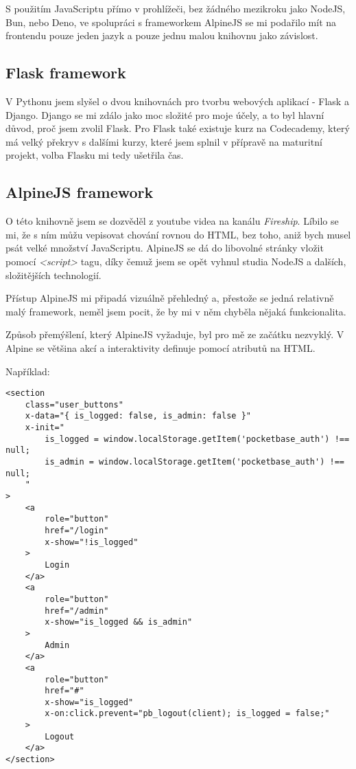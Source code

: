\documentclass[11pt,a4paper,twoside,openright]{report}
\begin{document}
S použitím JavaScriptu přímo v prohlížeči, bez žádného mezikroku jako NodeJS, Bun, nebo Deno, ve spolupráci
s frameworkem AlpineJS se mi podařilo mít na frontendu pouze jeden jazyk a pouze
jednu malou knihovnu jako závislost.

\subsection{Flask framework}
V Pythonu jsem slyšel o dvou knihovnách pro tvorbu webových aplikací - Flask a Django. Django se mi zdálo
jako moc složité pro moje účely, a to byl hlavní důvod, proč jsem zvolil Flask. Pro Flask také existuje
kurz na Codecademy, který má velký překryv s dalšími kurzy, které jsem splnil v přípravě na maturitní projekt,
volba Flasku mi tedy ušetřila čas.

\subsection{AlpineJS framework}
O této knihovně jsem se dozvěděl z youtube videa na kanálu \emph{Fireship}. Líbilo se mi, že s ním můžu
vepisovat chování rovnou do HTML, bez toho, aniž bych musel psát velké množství JavaScriptu. AlpineJS se
dá do libovolné stránky vložit pomocí \emph{<script>} tagu, díky čemuž jsem se opět vyhnul studia NodeJS
a dalších, složitějších technologií.

Přístup AlpineJS mi připadá vizuálně přehledný a, přestože se jedná relativně malý framework, neměl jsem
pocit, že by mi v něm chyběla nějaká funkcionalita.

Způsob přemýšlení, který AlpineJS vyžaduje, byl pro mě ze začátku nezvyklý. V Alpine se většina akcí a interaktivity
definuje pomocí atributů na HTML.

Například:

\begin{verbatim}
<section
	class="user_buttons"
	x-data="{ is_logged: false, is_admin: false }"
	x-init="
		is_logged = window.localStorage.getItem('pocketbase_auth') !== null;
		is_admin = window.localStorage.getItem('pocketbase_auth') !== null;
	"
>
    <a
    	role="button"
    	href="/login"
    	x-show="!is_logged"
    >
    	Login
    </a>
    <a
    	role="button"
    	href="/admin"
    	x-show="is_logged && is_admin"
    >
        Admin
    </a>
    <a
        role="button"
        href="#"
        x-show="is_logged"
        x-on:click.prevent="pb_logout(client); is_logged = false;"
    >
    	Logout
    </a>
</section>
\end{verbatim}
\end{document}
